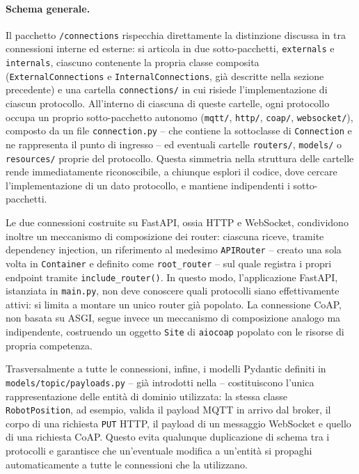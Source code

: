 \paragraph{Schema generale.}
Il pacchetto \texttt{/connections} rispecchia direttamente la distinzione discussa in  tra connessioni interne ed esterne: si articola in due sotto-pacchetti, \texttt{externals} e \texttt{internals}, ciascuno contenente la propria classe composita (\texttt{ExternalConnections} e \texttt{InternalConnections}, già descritte nella sezione precedente) e una cartella \texttt{connections/} in cui risiede l'implementazione di ciascun protocollo. All'interno di ciascuna di queste cartelle, ogni protocollo occupa un proprio sotto-pacchetto autonomo (\texttt{mqtt/}, \texttt{http/}, \texttt{coap/}, \texttt{websocket/}), composto da un file \texttt{connection.py} -- che contiene la sottoclasse di \texttt{Connection} e ne rappresenta il punto di ingresso -- ed eventuali cartelle \texttt{routers/}, \texttt{models/} o \texttt{resources/} proprie del protocollo. Questa simmetria nella struttura delle cartelle rende immediatamente riconoscibile, a chiunque esplori il codice, dove cercare l'implementazione di un dato protocollo, e mantiene indipendenti i sotto-pacchetti.

Le due connessioni costruite su FastAPI, ossia \ac{HTTP} e WebSocket, condividono inoltre un meccanismo di composizione dei router: ciascuna riceve, tramite dependency injection, un riferimento al medesimo \texttt{APIRouter} -- creato una sola volta in \texttt{Container} e definito come \texttt{root\_router} -- sul quale registra i propri endpoint tramite \texttt{include\_router()}. In questo modo, l'applicazione FastAPI, istanziata in \texttt{main.py}, non deve conoscere quali protocolli siano effettivamente attivi: si limita a montare un unico router già popolato. La connessione \ac{CoAP}, non basata su \ac{ASGI}, segue invece un meccanismo di composizione analogo ma indipendente, costruendo un oggetto \texttt{Site} di \texttt{aiocoap} popolato con le risorse di propria competenza.

Trasversalmente a tutte le connessioni, infine, i modelli Pydantic definiti in \texttt{models/topic/payloads.py} -- già introdotti nella  -- costituiscono l'unica rappresentazione delle entità di dominio utilizzata: la stessa classe \\\texttt{RobotPosition}, ad esempio, valida il payload \ac{MQTT} in arrivo dal broker, il corpo di una richiesta \texttt{PUT} \ac{HTTP}, il payload di un messaggio WebSocket e quello di una richiesta \ac{CoAP}. Questo evita qualunque duplicazione di schema tra i protocolli e garantisce che un'eventuale modifica a un'entità si propaghi automaticamente a tutte le connessioni che la utilizzano.

